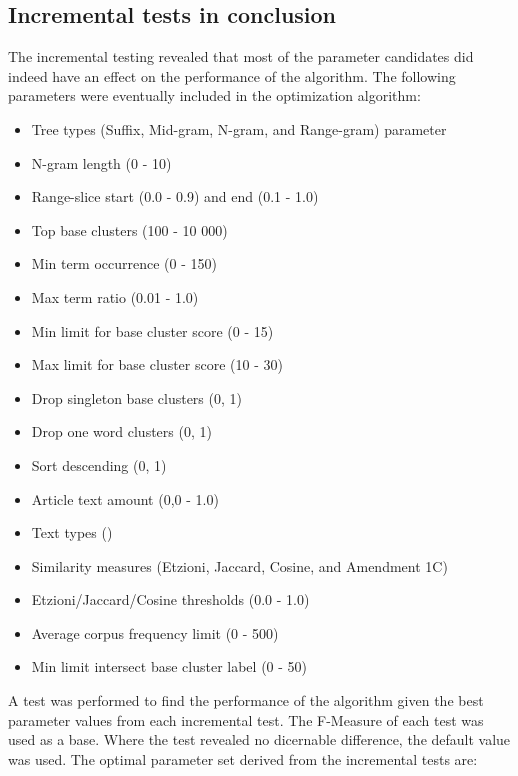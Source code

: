\subsection{Incremental tests in conclusion}
\label{IncrementalConclusion}
The incremental testing revealed that most of the parameter candidates did indeed have an effect on the performance of the \CTC algorithm. The following parameters were eventually included in the optimization algorithm:
\begin{itemize}
  \item Tree types (Suffix, Mid-gram, N-gram, and Range-gram) parameter
  \item N-gram length (0 - 10)
  \item Range-slice start (0.0 - 0.9) and end (0.1 - 1.0)
  \item Top base clusters (100 - 10 000)
  \item Min term occurrence (0 - 150)
  \item Max term ratio (0.01 - 1.0)
  \item Min limit for base cluster score (0 - 15)
  \item Max limit for base cluster score (10 - 30)
  \item Drop singleton base clusters (0, 1)
  \item Drop one word clusters (0, 1)
  \item Sort descending (0, 1)
  \item Article text amount (0,0 - 1.0)
  \item Text types ()
  \item Similarity measures (Etzioni, Jaccard, Cosine, and Amendment 1C)
  \item Etzioni/Jaccard/Cosine thresholds (0.0 - 1.0)
  \item Average corpus frequency limit (0 - 500)
  \item Min limit intersect base cluster label (0 - 50)
\end{itemize}
A test was performed to find the performance of the algorithm given the best parameter values from each incremental test. The F-Measure of each test was used as a base. Where the test revealed no dicernable difference, the default value was used. The optimal parameter set derived from the incremental tests are:

